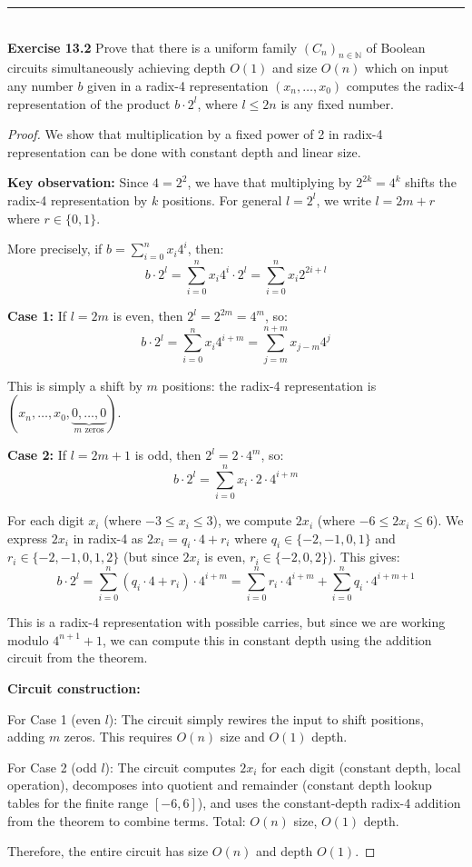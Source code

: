 \documentclass[a4paper]{article}
\begin{document}
\noindent\rule{12cm}{0.4pt}\\
\noindent \textbf{Exercise 13.2} Prove that there is a uniform family $(C_{n})_{n \in \mathbb{N}}$ of Boolean circuits simultaneously achieving depth $O(1)$ and size $O(n)$ which on input any number $b$ given in a radix-4 representation $(x_{n}, \ldots, x_{0})$ computes the radix-4 representation of the product $b \cdot 2^{l}$, where $l \leq 2n$ is any fixed number.
\begin{proof}
We show that multiplication by a fixed power of 2 in radix-4 representation can be done with constant depth and linear size.

\textbf{Key observation:} Since $4 = 2^2$, we have that multiplying by $2^{2k} = 4^k$ shifts the radix-4 representation by $k$ positions. For general $l = 2^l$, we write $l = 2m + r$ where $r \in \{0, 1\}$.

More precisely, if $b = \sum_{i=0}^{n} x_i 4^i$, then:
$$b \cdot 2^l = \sum_{i=0}^{n} x_i 4^i \cdot 2^l = \sum_{i=0}^{n} x_i 2^{2i+l}$$

\textbf{Case 1:} If $l = 2m$ is even, then $2^l = 2^{2m} = 4^m$, so:
$$b \cdot 2^l = \sum_{i=0}^{n} x_i 4^{i+m} = \sum_{j=m}^{n+m} x_{j-m} 4^j$$

This is simply a shift by $m$ positions: the radix-4 representation is $(x_n, \ldots, x_0, \underbrace{0, \ldots, 0}_{m \text{ zeros}})$.

\textbf{Case 2:} If $l = 2m + 1$ is odd, then $2^l = 2 \cdot 4^m$, so:
$$b \cdot 2^l = \sum_{i=0}^{n} x_i \cdot 2 \cdot 4^{i+m}$$

For each digit $x_i$ (where $-3 \leq x_i \leq 3$), we compute $2x_i$ (where $-6 \leq 2x_i \leq 6$). We express $2x_i$ in radix-4 as $2x_i = q_i \cdot 4 + r_i$ where $q_i \in \{-2, -1, 0, 1\}$ and $r_i \in \{-2, -1, 0, 1, 2\}$ (but since $2x_i$ is even, $r_i \in \{-2, 0, 2\}$). This gives:
$$b \cdot 2^l = \sum_{i=0}^{n} (q_i \cdot 4 + r_i) \cdot 4^{i+m} = \sum_{i=0}^{n} r_i \cdot 4^{i+m} + \sum_{i=0}^{n} q_i \cdot 4^{i+m+1}$$

This is a radix-4 representation with possible carries, but since we are working modulo $4^{n+1}+1$, we can compute this in constant depth using the addition circuit from the theorem.

\textbf{Circuit construction:}

For Case 1 (even $l$): The circuit simply rewires the input to shift positions, adding $m$ zeros. This requires $O(n)$ size and $O(1)$ depth.

For Case 2 (odd $l$): The circuit computes $2x_i$ for each digit (constant depth, local operation), decomposes into quotient and remainder (constant depth lookup tables for the finite range $[-6, 6]$), and uses the constant-depth radix-4 addition from the theorem to combine terms. Total: $O(n)$ size, $O(1)$ depth.

Therefore, the entire circuit has size $O(n)$ and depth $O(1)$.
\end{proof}
\end{document}
